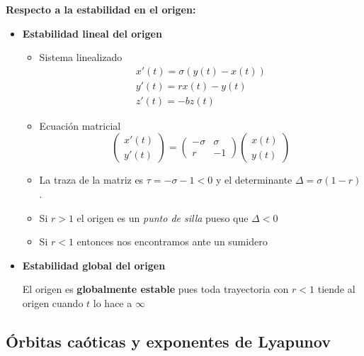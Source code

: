 \documentclass[8pt]{beamer}
\begin{document}
\begin{frame}
\textbf{Respecto a la estabilidad en el origen:}

\begin{itemize}[<+(1)->]
\item \textbf{Estabilidad lineal del origen}

\begin{itemize}[<+(1)->]
\item Sistema linealizado
\[\begin{array}{l}
x'(t) = σ(y(t)-x(t)) \\
y'(t) = rx(t)-y(t)\\
z'(t) = -bz(t)
\end{array}\]
\item Ecuación matricial
\[\left(\begin{array}{l}
x'(t) \\ y'(t)
\end{array} \right) = \left(\begin{array}{cc}
-σ & σ \\ r & -1
\end{array} \right)\left(\begin{array}{l}
x(t) \\ y(t)
\end{array} \right)\]
\item La traza de la matriz es $τ=-σ-1<0$ y el determinante $Δ = σ(1-r)$.
\item Si $r>1$ el origen es un \emph{punto de silla} pueso que $Δ<0$
\item Si $r<1$ entonces nos encontramos ante un sumidero
\end{itemize}
\item \textbf{Estabilidad global del origen}

El origen es \textbf{globalmente estable} pues toda trayectoria con $r<1$ tiende al origen cuando $t$ lo hace a $\infty$
\end{itemize}
\end{frame}


\subsection{Órbitas caóticas y exponentes de Lyapunov}
\end{document}
